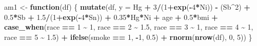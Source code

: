 \documentclass[12pt, twoside]{amherstthesis}
\newenvironment{Shaded}{\begin{snugshade}}{\end{snugshade}}
\newcommand{\AttributeTok}[1]{\textcolor[rgb]{0.13,0.29,0.53}{#1}}
\newcommand{\ControlFlowTok}[1]{\textcolor[rgb]{0.13,0.29,0.53}{\textbf{#1}}}
\newcommand{\DecValTok}[1]{\textcolor[rgb]{0.00,0.00,0.81}{#1}}
\newcommand{\FloatTok}[1]{\textcolor[rgb]{0.00,0.00,0.81}{#1}}
\newcommand{\FunctionTok}[1]{\textcolor[rgb]{0.13,0.29,0.53}{\textbf{#1}}}
\newcommand{\NormalTok}[1]{#1}
\newcommand{\OtherTok}[1]{\textcolor[rgb]{0.56,0.35,0.01}{#1}}
\newcommand{\SpecialCharTok}[1]{\textcolor[rgb]{0.81,0.36,0.00}{\textbf{#1}}}
\begin{document}
\begin{Shaded}
\begin{Highlighting}[]
\NormalTok{am1 }\OtherTok{\textless{}{-}} \ControlFlowTok{function}\NormalTok{(df) \{}
  \FunctionTok{mutate}\NormalTok{(df, }\AttributeTok{y =} 
\NormalTok{           Hg }\SpecialCharTok{+} \DecValTok{3}\SpecialCharTok{/}\NormalTok{(}\DecValTok{1}\SpecialCharTok{+}\FunctionTok{exp}\NormalTok{(}\SpecialCharTok{{-}}\DecValTok{4}\SpecialCharTok{*}\NormalTok{Ni)) }\SpecialCharTok{{-}}\NormalTok{ (Sb}\SpecialCharTok{\^{}}\DecValTok{2}\NormalTok{) }\SpecialCharTok{+} \FloatTok{0.5}\SpecialCharTok{*}\NormalTok{Sb }\SpecialCharTok{+} \FloatTok{1.5}\SpecialCharTok{/}\NormalTok{(}\DecValTok{1}\SpecialCharTok{+}\FunctionTok{exp}\NormalTok{(}\SpecialCharTok{{-}}\DecValTok{4}\SpecialCharTok{*}\NormalTok{Sn)) }\SpecialCharTok{+} 
           \FloatTok{0.35}\SpecialCharTok{*}\NormalTok{Hg}\SpecialCharTok{*}\NormalTok{Ni }\SpecialCharTok{+} 
\NormalTok{           age }\SpecialCharTok{+} \FloatTok{0.5}\SpecialCharTok{*}\NormalTok{bmi }\SpecialCharTok{+} 
           \FunctionTok{case\_when}\NormalTok{(race }\SpecialCharTok{==} \DecValTok{1} \SpecialCharTok{\textasciitilde{}} \DecValTok{1}\NormalTok{, }
\NormalTok{                     race }\SpecialCharTok{==} \DecValTok{2} \SpecialCharTok{\textasciitilde{}} \FloatTok{1.5}\NormalTok{, }
\NormalTok{                     race }\SpecialCharTok{==} \DecValTok{3} \SpecialCharTok{\textasciitilde{}} \DecValTok{1}\NormalTok{, }
\NormalTok{                     race }\SpecialCharTok{==} \DecValTok{4} \SpecialCharTok{\textasciitilde{}} \DecValTok{1}\NormalTok{, }
\NormalTok{                     race }\SpecialCharTok{==} \DecValTok{5} \SpecialCharTok{\textasciitilde{}} \FloatTok{1.5}\NormalTok{) }\SpecialCharTok{+}
           \FunctionTok{ifelse}\NormalTok{(smoke }\SpecialCharTok{==} \DecValTok{1}\NormalTok{, }\SpecialCharTok{{-}}\DecValTok{1}\NormalTok{, }\FloatTok{0.5}\NormalTok{) }\SpecialCharTok{+}
           \FunctionTok{rnorm}\NormalTok{(}\FunctionTok{nrow}\NormalTok{(df), }\DecValTok{0}\NormalTok{, }\DecValTok{5}\NormalTok{))}
\NormalTok{\}}


\end{Highlighting}
\end{Shaded}
\end{document}

